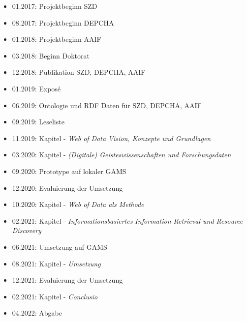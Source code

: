 \documentclass[12pt,a4paper]{article}
\begin{document}
\begin{itemize}
\item 01.2017: Projektbeginn SZD
\item 08.2017: Projektbeginn DEPCHA
\item 01.2018: Projektbeginn AAIF
\item 03.2018: Beginn Doktorat
\item 12.2018: Publikation SZD, DEPCHA, AAIF
\item 01.2019: Exposé
\item 06.2019: Ontologie und RDF Daten für SZD, DEPCHA, AAIF
\item 09.2019: Leseliste
\item 11.2019: Kapitel - \textit{Web of Data Vision, Konzepte und Grundlagen} 
\item 03.2020: Kapitel - \textit{(Digitale) Geisteswissenschaften und Forschungsdaten}
\item 09.2020: Prototype auf lokaler GAMS
\item 12.2020: Evaluierung der Umsetzung
\item 10.2020: Kapitel - \textit{Web of Data als Methode}
\item 02.2021: Kapitel - \textit{ Informationsbasiertes Information Retrieval und Resource Discovery  }
\item 06.2021: Umsetzung auf GAMS
\item 08.2021: Kapitel - \textit{Umsetzung}
\item 12.2021: Evaluierung der Umsetzung
\item 02.2021: Kapitel - \textit{Conclusio}
\item 04.2022: Abgabe
\end{itemize}
\end{document}
